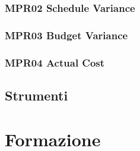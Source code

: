 \subsubsection{MPR02 Schedule Variance}\label{4.2.5.2}

\subsubsection{MPR03 Budget Variance}\label{4.2.5.3}

\subsubsection{MPR04 Actual Cost}\label{4.2.5.4}

\subsection{Strumenti}\label{4.2.6}

\section{Formazione}\label{4.3}